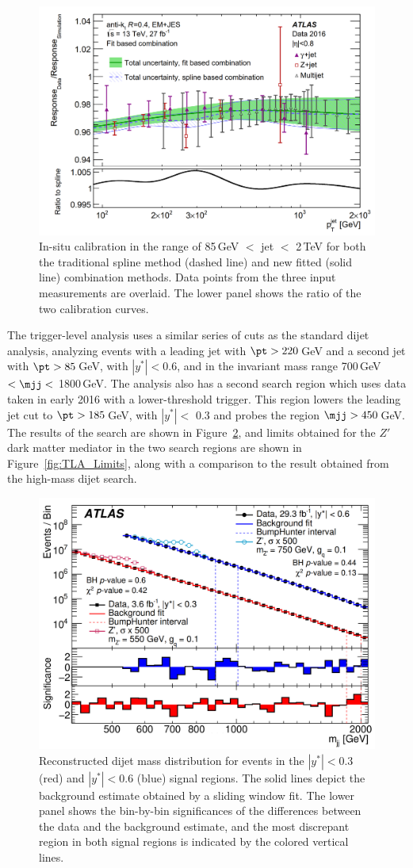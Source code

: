 \begin{figure}[ht!]
	\centering
	\includegraphics[width=0.7\columnwidth]{figures/Conclusion/JES_TLA.png}
	\caption{In-situ calibration in the range of 85\,GeV $<$ jet \pt $<$ 2\,TeV for both the traditional spline method (dashed line) and new fitted (solid line) combination methods.  Data points from the three input measurements are overlaid.  The lower panel shows the ratio of the two calibration curves.}
	\label{fig:JES_TLA}
\end{figure}

The trigger-level analysis uses a similar series of cuts as the standard dijet analysis, analyzing events with a leading jet with $\pt > 220$\,GeV and a second jet with $\pt > 85$\,GeV, with $|y^*|<$0.6, and in the invariant mass range 700\,GeV $< \mjj <$ 1800\,GeV.  The analysis also has a second search region which uses data taken in early 2016 with a lower-threshold trigger.  This region lowers the leading jet cut to $\pt > 185$\,GeV, with $|y^*| <$ 0.3 and probes the region $\mjj > 450$\,GeV.  The results of the search are shown in Figure~\ref{fig:TLA_Search}, and limits obtained for the $Z'$ dark matter mediator in the two search regions are shown in Figure~\ref{fig:TLA_Limits}, along with a comparison to the result obtained from the high-mass dijet search.\cite{DijetTLA}

\begin{figure}[ht!]
	\centering
	\includegraphics[width=0.7\columnwidth]{figures/Conclusion/TLA_Search.png}
	\caption{Reconstructed dijet mass distribution for events in the $|y^*|<0.3$ (red) and $|y^*|<0.6$ (blue) signal regions.  The solid lines depict the background estimate obtained by a sliding window fit.  The lower panel shows the bin-by-bin significances of the differences between the data and the background estimate, and the most discrepant region in both signal regions is indicated by the colored vertical lines.}
	\label{fig:TLA_Search}
\end{figure}

